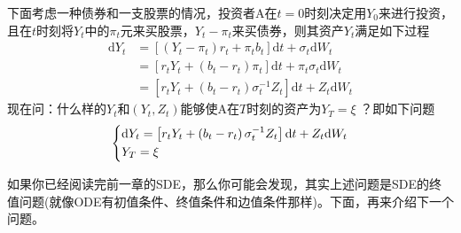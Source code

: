 		下面考虑一种债券和一支股票的情况，投资者A在$t=0$时刻决定用$Y_0$来进行投资，且在$t$时刻将$Y_t$中的$\pi_t$元来买股票，$Y_t-\pi_t $来买债券，则其资产$Y_t$满足如下过程
		\begin{align*}
			\mathrm{d}{Y_t} &= \left[( {Y_t} - {\pi _t} ){r_t} + {\pi _t}{b_t}\right]{\mathrm{d}t} + {\sigma_t}\mathrm{d}{W_t}\\
			& = [ {{r_t}{Y_t} + ( {{b_t} - {r_t}} ){\pi _t}} ]{\mathrm{d}t} + \pi _t {\sigma_t}\mathrm{d}{W_t}\\
			&=\left[ {r_t}{Y_t} + \left( {{b_t} - {r_t}} \right)\sigma _t^{-1}{Z_t} \right]{\mathrm{d}t} + {Z_t}\mathrm{d}{W_t}
		\end{align*}
		现在问：什么样的$Y_t$和$(Y_t,Z_t)$能够使A在$T$时刻的资产为${Y_T} = \xi $ ？即如下问题
		\begin{align}\label{eq:组合投资问题}
			\centering
			\left\{\begin{aligned}
			& \mathrm{d}{Y_t} = \left[ {r_t}{Y_t} + \left( {{b_t} - {r_t}} \right)\sigma _t^{-1}{Z_t} \right]{\mathrm{d}t} + {Z_t}\mathrm{d}{W_t}\\
			& {Y_T} = \xi
			\end{aligned} \right.
		\end{align}
		\par
		如果你已经阅读完前一章的SDE，那么你可能会发现，其实上述问题是SDE的终值问题(就像ODE有初值条件、终值条件和边值条件那样)。下面，再来介绍下一个问题。

